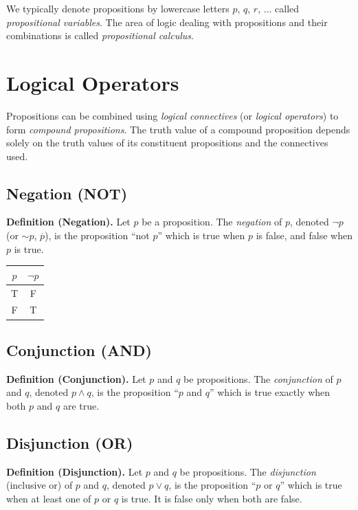 \documentclass[11pt,a4paper]{article}
\begin{document}
We typically denote propositions by lowercase letters $p$, $q$, $r$, $\dots$ called \textit{propositional variables}. The area of logic dealing with propositions and their combinations is called \textit{propositional calculus}.

\section{Logical Operators}

Propositions can be combined using \textit{logical connectives} (or \textit{logical operators}) to form \textit{compound propositions}. The truth value of a compound proposition depends solely on the truth values of its constituent propositions and the connectives used.

\subsection{Negation (NOT)}

\textbf{Definition (Negation).} Let $p$ be a proposition. The \textit{negation} of $p$, denoted $\neg p$ (or $\sim p$, $\overline{p}$), is the proposition ``not $p$'' which is true when $p$ is false, and false when $p$ is true.

\begin{center}
\begin{tabular}{|c|c|}
\hline
$p$ & $\neg p$ \\
\hline
T & F \\
F & T \\
\hline
\end{tabular}
\end{center}

\subsection{Conjunction (AND)}

\textbf{Definition (Conjunction).} Let $p$ and $q$ be propositions. The \textit{conjunction} of $p$ and $q$, denoted $p \land q$, is the proposition ``$p$ and $q$'' which is true exactly when both $p$ and $q$ are true.

\subsection{Disjunction (OR)}

\textbf{Definition (Disjunction).} Let $p$ and $q$ be propositions. The \textit{disjunction} (inclusive or) of $p$ and $q$, denoted $p \lor q$, is the proposition ``$p$ or $q$'' which is true when at least one of $p$ or $q$ is true. It is false only when both are false.
\end{document}
